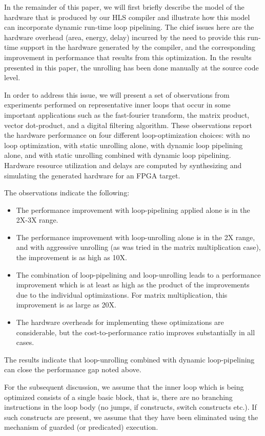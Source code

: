 \documentclass[conference]{IEEEtran}
\begin{document}
In the remainder of this paper, we will first briefly describe the model of
the hardware that is produced by our HLS compiler and illustrate how this model
can incorporate dynamic run-time loop pipelining.  The chief issues here are the
hardware overhead (area, energy, delay) incurred by the need to provide 
this run-time support in the hardware generated by the compiler, and
the corresponding improvement in performance that results from this optimization.
In the results presented in this paper, the unrolling has been done 
manually at the source code level.

In order to address this issue, we will present a set of observations from
experiments performed on representative inner loops that occur in 
some important applications such as the fast-fourier transform, the
matrix product, vector dot-product, and a digital filtering algorithm.
These observations report the hardware performance on four different
loop-optimization choices: with no loop optimization, with static unrolling
alone, with dynamic loop pipelining alone, and with static unrolling combined with
dynamic loop pipelining.  Hardware resource utilization and delays are
computed by synthesizing and simulating the generated hardware for an FPGA target.

The observations indicate the following:
\begin{itemize}
\item The performance improvement with loop-pipelining applied alone is in the
2X-3X range. 
\item The performance improvement with loop-unrolling alone is in the 
2X range, and with aggressive unrolling (as was tried in the matrix multiplication
case), the improvement is as high as 10X.
\item The combination of loop-pipelining and loop-unrolling leads
to a performance improvement which is at least as high as the
product of the improvements due to the individual optimizations.  
For matrix multiplication, this improvement is as large as 20X.
\item The hardware overheads for implementing these optimizations are considerable,
but the cost-to-performance ratio improves substantially in all cases.
\end{itemize}
The results indicate that loop-unrolling combined with dynamic loop-pipelining
can close the performance gap noted above.

For the subsequent discussion, we assume that the inner
loop which is being optimized consists of a single
basic block, that is, there are no branching instructions
in the loop body (no jumps, if constructs, switch constructs etc.).
If such constructs are present, we assume that they have been
eliminated using the mechanism of guarded (or predicated) execution.
\end{document}
